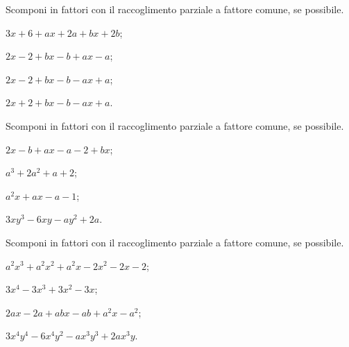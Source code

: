 \begin{esercizio}
\label{ese:13.22}
Scomponi in fattori con il raccoglimento parziale a fattore comune, se possibile.
\begin{multicols}{2}
\begin{enumeratea}
 \item $3x+6+ax+2a+bx+2b$;
 \item $2x-2+bx-b+ax-a$;
 \item $2x-2+bx-b-ax+a$;
 \item $2x+2+bx-b-ax+a$.
\end{enumeratea}
\end{multicols}
\end{esercizio}

\begin{esercizio}
\label{ese:13.23}
Scomponi in fattori con il raccoglimento parziale a fattore comune, se possibile.
\begin{multicols}{2}
\begin{enumeratea}
 \item $2x-b+ax-a-2+bx$;
 \item $a^{3}+2a^{2}+a+2$;
 \item $a^{2}x+ax-a-1$;
 \item $3xy^{3}-6xy-ay^{2}+2a$.
\end{enumeratea}
\end{multicols}
\end{esercizio}

\begin{esercizio}
\label{ese:13.24}
Scomponi in fattori con il raccoglimento parziale a fattore comune, se possibile.
\begin{multicols}{2}
\begin{enumeratea}
 \item $a^{2}x^{3}+a^{2}x^{2}+a^{2}x-2x^{2}-2x-2$;
 \item $3x^{4}-3x^{3}+3x^{2}-3x$;
 \item $2ax-2a+abx-ab+a^{2}x-a^{2}$;
 \item $3x^{4}y^{4}-6x^{4}y^{2}-ax^{3}y^{3}+2ax^{3}y$.
\end{enumeratea}
\end{multicols}
\end{esercizio}

